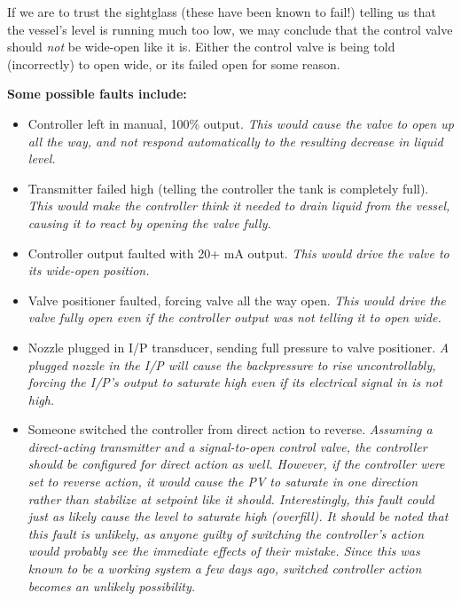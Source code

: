 
If we are to trust the sightglass (these have been known to fail!) telling us that the vessel's level is running much too low, we may conclude that the control valve should {\it not} be wide-open like it is.  Either the control valve is being told (incorrectly) to open wide, or its failed open for some reason.

\vskip 10pt

{\bf Some possible faults include:}

\begin{itemize}
\item{} Controller left in manual, 100\% output.  {\it This would cause the valve to open up all the way, and not respond automatically to the resulting decrease in liquid level.}
\vskip 10pt
\item{} Transmitter failed high (telling the controller the tank is completely full).  {\it This would make the controller think it needed to drain liquid from the vessel, causing it to react by opening the valve fully.}
\vskip 10pt
\item{} Controller output faulted with 20+ mA  output.  {\it This would drive the valve to its wide-open position.}
\vskip 10pt
\item{} Valve positioner faulted, forcing valve all the way open.  {\it This would drive the valve fully open even if the controller output was not telling it to open wide.}
\vskip 10pt
\item{} Nozzle plugged in I/P transducer, sending full pressure to valve positioner.  {\it A plugged nozzle in the I/P will cause the backpressure to rise uncontrollably, forcing the I/P's output to saturate high even if its electrical signal in is not high.}
\vskip 10pt
\item{} Someone switched the controller from direct action to reverse.  {\it Assuming a direct-acting transmitter and a signal-to-open control valve, the controller should be configured for direct action as well.  However, if the controller were set to reverse action, it would cause the PV to saturate in one direction rather than stabilize at setpoint like it should.  Interestingly, this fault could just as likely cause the level to saturate high (overfill).  It should be noted that this fault is unlikely, as anyone guilty of switching the controller's action would probably see the immediate effects of their mistake.  Since this was known to be a working system a few days ago, switched controller action becomes an unlikely possibility.}
\end{itemize}





